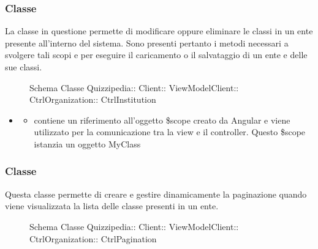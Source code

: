 \subsubsection{Classe }
La classe in questione permette di modificare oppure eliminare le classi in un ente presente all'interno del sistema.
Sono presenti pertanto i metodi necessari a svolgere tali scopi e per eseguire il caricamento o il salvataggio di un ente e delle sue classi.
\begin{figure}[H]
\centering
\noindent{}
\caption[Schema Classe CtrlInstitution]{Schema Classe Quizzipedia:: Client:: ViewModelClient:: CtrlOrganization:: CtrlInstitution}
\end{figure}
\begin{itemize}
\item {}
\begin{itemize}
\item {}
\newline
contiene un riferimento all'oggetto \$scope creato da Angular e viene utilizzato per la comunicazione tra la view e il controller. Questo \$scope istanzia un oggetto MyClass
\end{itemize}
\end{itemize}
\subsubsection{Classe }
Questa classe permette di creare e gestire dinamicamente la paginazione quando viene visualizzata la lista delle classe presenti in un ente.
\begin{figure}[H]
\centering
\noindent{}
\caption[Schema Classe CtrlPagination]{Schema Classe Quizzipedia:: Client:: ViewModelClient:: CtrlOrganization:: CtrlPagination}
\end{figure}
\begin{itemize}
\end{itemize}

